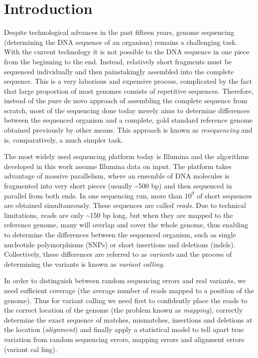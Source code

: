 \chapter{Introduction} 
\label{chap:introduction} 

Despite technological advances in the past fifteen years, genome sequencing (determining the DNA sequence of an organism) remains a challenging task. With the current technology it is not possible to the DNA sequence in one 
piece from the beginning to the end. Instead, relatively short fragments must 
be sequenced individually and then painstakingly assembled into the complete 
sequence. This is a very laborious and expensive process, complicated by the fact 
that large proportion of most genomes consists of repetitive sequences. Therefore, 
instead of the pure de novo approach of assembling the complete sequence from 
scratch, most of the sequencing done today merely aims to determine differences 
between the sequenced organism and a complete, gold standard reference genome obtained previously by other means. This approach is known as \textit{resequencing} and is, comparatively, a much simpler task. 

The most widely used sequencing platform today is Illumina and the algorithms developed in this work assume Illumina data on input. The platform takes advantage of massive parallelism, where an ensemble of DNA molecules is fragmented into very short pieces (usually \textasciitilde 500 bp) and then sequenced in parallel from both ends. In one sequencing run, more than $10^9$ of short sequences are obtained simultaneously. These sequences are called \textit{reads}. Due to technical limitations, reads are only \textasciitilde 150 bp long, but when they are mapped to the reference genome, many will overlap and cover the whole genome, thus enabling to determine the differences between the sequenced organism, such as single nucleotide polymorphisms (SNPs) or short insertions and deletions (indels). Collectively, these differences are referred to as \textit{variants} and the process of determining the variants is known as \textit{variant calling}. 

In order to distinguish between random sequencing errors and real variants, we need sufficient coverage (the average number of reads mapped to a position of 
the genome). Thus for variant calling we need first to confidently place the reads 
to the correct location of the genome (the problem known as \textit{mapping}), correctly determine the exact sequence of matches, mismatches, insertions and deletions at the location (\textit{alignment}) and finally apply a statistical model to tell apart true variation from random sequencing errors, mapping errors and alignment errors (variant cal ling). 

